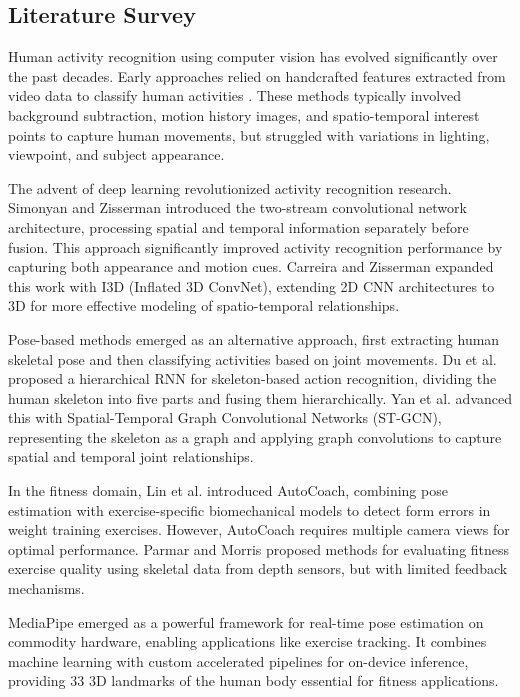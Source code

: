 \documentclass[11pt]{article}
\begin{document}
\subsection{Literature Survey}
Human activity recognition using computer vision has evolved significantly over the past decades. Early approaches relied on handcrafted features extracted from video data to classify human activities \cite{aggarwal2011}. These methods typically involved background subtraction, motion history images, and spatio-temporal interest points to capture human movements, but struggled with variations in lighting, viewpoint, and subject appearance.

The advent of deep learning revolutionized activity recognition research. Simonyan and Zisserman \cite{simonyan2014} introduced the two-stream convolutional network architecture, processing spatial and temporal information separately before fusion. This approach significantly improved activity recognition performance by capturing both appearance and motion cues. Carreira and Zisserman \cite{carreira2017} expanded this work with I3D (Inflated 3D ConvNet), extending 2D CNN architectures to 3D for more effective modeling of spatio-temporal relationships.

Pose-based methods emerged as an alternative approach, first extracting human skeletal pose and then classifying activities based on joint movements. Du et al. \cite{du2015} proposed a hierarchical RNN for skeleton-based action recognition, dividing the human skeleton into five parts and fusing them hierarchically. Yan et al. \cite{yan2018} advanced this with Spatial-Temporal Graph Convolutional Networks (ST-GCN), representing the skeleton as a graph and applying graph convolutions to capture spatial and temporal joint relationships.

In the fitness domain, Lin et al. \cite{lin2020} introduced AutoCoach, combining pose estimation with exercise-specific biomechanical models to detect form errors in weight training exercises. However, AutoCoach requires multiple camera views for optimal performance. Parmar and Morris \cite{parmar2019} proposed methods for evaluating fitness exercise quality using skeletal data from depth sensors, but with limited feedback mechanisms.

MediaPipe \cite{lugaresi2019} emerged as a powerful framework for real-time pose estimation on commodity hardware, enabling applications like exercise tracking. It combines machine learning with custom accelerated pipelines for on-device inference, providing 33 3D landmarks of the human body essential for fitness applications.
\end{document}
